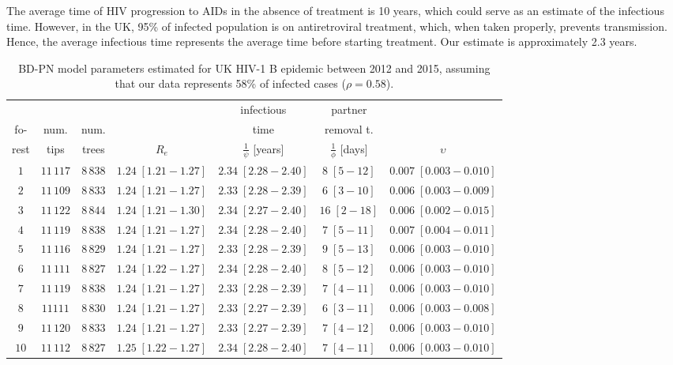 \documentclass[a4paper,10pt]{article}
\begin{document}
The average time of HIV progression to AIDs in the absence of treatment is 10 years, which could serve as an estimate of the infectious time. However, in the UK, 95\% of infected population is on antiretroviral treatment, which, when taken properly, prevents transmission. Hence, the average infectious time represents the average time before starting treatment. Our estimate is approximately 2.3 years. 

\begin{table}
\caption{BD-PN model parameters estimated for UK HIV-1 B epidemic between 2012 and 2015, assuming that our data represents 58\% of infected cases ($\rho=0.58$).}
\label{tbl:uk}
\begin{tabular}{c|cc|cccc}
&&&&infectious&partner&\\
fo-&num.&num.&&time&removal t.&\\
rest&tips&trees&$R_e$&$\frac{1}{\psi}$ [years]& $\frac{1}{\phi}$ [days]&$\upsilon$\\
\toprule
 $1$ & $11\,117$ & $8\,838$& $1.24\;[1.21-1.27]$& $2.34\;[2.28-2.40]$& $8\;[5-12]$& $0.007\;[0.003-0.010]$ \\
 $2$ & $11\,109$ & $8\,833$& $1.24\;[1.21-1.27]$& $2.33\;[2.28-2.39]$& $6\;[3-10]$& $0.006\;[0.003-0.009]$ \\
 $3$ & $11\,122$ & $8\,844$& $1.24\;[1.21-1.30]$& $2.34\;[2.27-2.40]$& $16\;[2-18]$& $0.006\;[0.002-0.015]$ \\
 $4$ & $11\,119$ & $8\,838$& $1.24\;[1.21-1.27]$& $2.34\;[2.28-2.40]$& $7\;[5-11]$& $0.007\;[0.004-0.011]$ \\
 $5$ & $11\,116$ & $8\,829$&  $1.24\;[1.21-1.27]$& $2.33\;[2.28-2.39]$& $9\;[5-13]$& $0.006\;[0.003-0.010]$ \\
 $6$ & $11\,111$ & $8\,827$&  $1.24\;[1.22-1.27]$& $2.34\;[2.28-2.40]$& $8\;[5-12]$& $0.006\;[0.003-0.010]$ \\
 $7$ & $11\,119$ & $8\,838$& $1.24\;[1.21-1.27]$& $2.33\;[2.28-2.39]$& $7\;[4-11]$& $0.006\;[0.003-0.010]$ \\
 $8$ & $11111$ & $8\,830$& $1.24\;[1.21-1.27]$& $2.33\;[2.27-2.39]$& $6\;[3-11]$& $0.006\;[0.003-0.008]$ \\
 $9$ & $11\,120$ & $8\,833$&  $1.24\;[1.21-1.27]$& $2.33\;[2.27-2.39]$& $7\;[4-12]$& $0.006\;[0.003-0.010]$ \\
 $10$ & $11\,112$ & $8\,827$& $1.25\;[1.22-1.27]$& $2.34\;[2.28-2.40]$& $7\;[4-11]$& $0.006\;[0.003-0.010]$ \\
 \bottomrule
 \end{tabular}
 \end{table}
\end{document}
